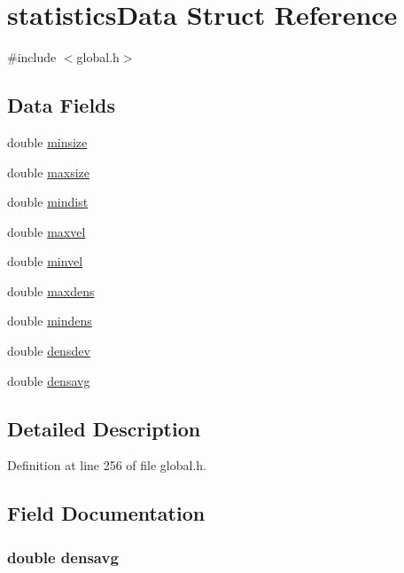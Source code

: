 \hypertarget{structstatisticsData}{\section{statistics\-Data Struct Reference}
\label{structstatisticsData}
}


{\ttfamily \#include $<$global.\-h$>$}

\subsection*{Data Fields}
\begin{DoxyCompactItemize}
\item 
double \hyperlink{structstatisticsData_ad99dc4104d1898b6e593bbf331e41c69}{minsize}
\item 
double \hyperlink{structstatisticsData_a7383c898fd4cd4d862ca65d3713086cd}{maxsize}
\item 
double \hyperlink{structstatisticsData_a78455d23ec97258967b76cbb2332b7be}{mindist}
\item 
double \hyperlink{structstatisticsData_a485292d20f5d14bd18e83fef65976fb4}{maxvel}
\item 
double \hyperlink{structstatisticsData_a1b9d00ac67b4ceca8e7747a50edc802b}{minvel}
\item 
double \hyperlink{structstatisticsData_abc8b83844f3405d9046189aa841b48fd}{maxdens}
\item 
double \hyperlink{structstatisticsData_a2ddb05b9ae611dab07eef62db427ed61}{mindens}
\item 
double \hyperlink{structstatisticsData_a62a3935a35dda8e375bf0ec6cc160d5e}{densdev}
\item 
double \hyperlink{structstatisticsData_ae897d6b29710ca63a31e17866c73bc9a}{densavg}
\end{DoxyCompactItemize}


\subsection{Detailed Description}


Definition at line 256 of file global.\-h.



\subsection{Field Documentation}
\hypertarget{structstatisticsData_ae897d6b29710ca63a31e17866c73bc9a}{
\subsubsection[{densavg}]{\setlength{\rightskip}{0pt plus 5cm}double densavg}}\label{structstatisticsData_ae897d6b29710ca63a31e17866c73bc9a}



